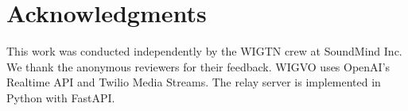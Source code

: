 \documentclass[11pt]{article}
\begin{document}
\section*{Acknowledgments}

This work was conducted independently by the WIGTN crew at SoundMind Inc. We thank the anonymous reviewers for their feedback. WIGVO uses OpenAI's Realtime API and Twilio Media Streams. The relay server is implemented in Python with FastAPI.



\end{document}
